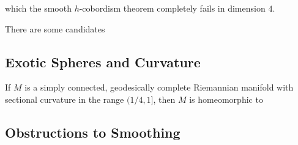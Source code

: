 \begin{theorem}
\end{theorem}

which the smooth $h$-cobordism theorem completely fails in dimension $4$.

There are some candidates


\subsection{Exotic Spheres and Curvature}

\begin{theorem}
	If $M$ is a simply connected, geodesically complete Riemannian manifold with sectional curvature in the range $(1/4,1]$, then $M$ is homeomorphic to 
\end{theorem}

\begin{definition}
\end{definition}

\subsection{Obstructions to Smoothing}\label{sec:smoothing-obstructions}

\begin{theorem}[Freedman, 1982]\label{thm:freedman-actual}
\end{theorem}

